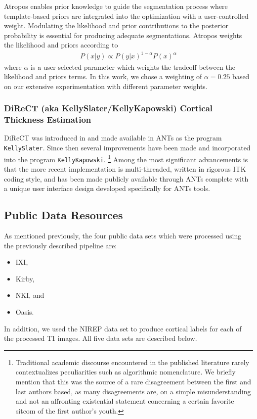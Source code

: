 Atropos enables prior knowledge to guide the
segmentation process where template-based priors are integrated into the optimization
with a user-controlled weight.  Modulating the likelihood and prior contributions
to the posterior probability is essential for producing adequate segmentations.
Atropos weights the likelihood and priors according to
\begin{align}
P(x|y) \propto P(y|x)^{1-\alpha}P(x)^{\alpha}
\end{align}
where $\alpha$ is a user-selected parameter which weights the tradeoff between the likelihood and priors terms.
In this work, we chose a weighting of $\alpha = 0.25$ 
based on our extensive experimentation with different parameter weights.


\subsubsection{DiReCT (aka KellySlater/KellyKapowski) Cortical Thickness Estimation}

DiReCT was introduced 
in \cite{das2009} and made available in ANTs as the program \verb#KellySlater#.
Since then several improvements have been made and incorporated into the program
\verb#KellyKapowski#.%
\footnote{
Traditional academic discourse encountered in the published literature
rarely contextualizes peculiarities such as algorithmic nomenclature.
We briefly mention that
this was the source of a rare disagreement between the first and last authors
based, as many disagreements are, on a simple misunderstanding and not an
affronting existential statement concerning a certain favorite sitcom
of the first author's youth. 
}
Among the most significant advancements is that the more recent
implementation is multi-threaded, written in rigorous ITK coding style, and 
has been made publicly available through  ANTs complete with a unique user 
interface design developed specifically for ANTs tools.  

\subsection{Public Data Resources}

As mentioned previously, the four public data sets which were processed
using the previously described pipeline are:
\begin{itemize}
  \item IXI,
  \item Kirby,
  \item NKI, and
  \item Oasis.
\end{itemize}
In addition, we used the NIREP data set to produce cortical labels for 
each of the processed T1 images.  All five data sets are described below.

